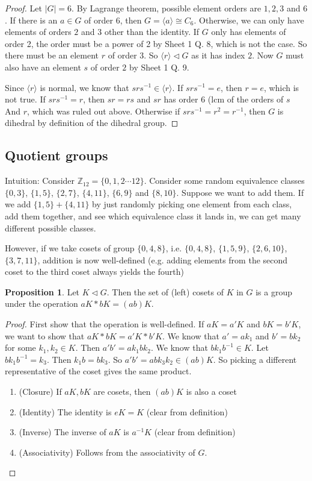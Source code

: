 \documentclass[a4paper]{article}
\theoremstyle{definition}
\newtheorem*{prop}{Proposition}
\newcommand{\Z}{\mathbb{Z}}
\newcommand{\bra}{\langle}
\newcommand{\ket}{\rangle}
\begin{document}
\begin{proof}
  Let $|G| = 6$. By Lagrange theorem, possible element orders are $1, 2, 3$ and $6$. If there is an $a\in G$ of order $6$, then $G = \bra a\ket \cong C_6$. Otherwise, we can only have elements of orders $2$ and $3$ other than the identity. If $G$ only has elements of order 2, the order must be a power of 2 by Sheet 1 Q. 8, which is not the case. So there must be an element $r$ of order 3. So $\bra r\ket\lhd G$ as it has index $2$. Now $G$ must also have an element $s$ of order $2$ by Sheet 1 Q. 9.

Since $\bra r\ket$ is normal, we know that $srs^{-1}\in \bra r\ket$. If $srs^{-1} = e$, then $r = e$, which is not true. If $srs^{-1} = r$, then $sr = rs$ and $sr$ has order $6$ (lcm of the orders of $s$ And $r$, which was ruled out above. Otherwise if $srs^{-1} = r^2 = r^{-1}$, then $G$ is dihedral by definition of the dihedral group.
\end{proof}

\subsection{Quotient groups}
Intuition: Consider $\Z_{12} = \{0, 1, 2\cdots 12\}$. Consider some random equivalence classes $\{0, 3\}$, $\{1, 5\}$, $\{2, 7\}$, $\{4, 11\}$, $\{6, 9\}$ and $\{8, 10\}$. Suppose we want to add them. If we add $\{1, 5\} + \{4, 11\}$ by just randomly picking one element from each class, add them together, and see which equivalence class it lands in, we can get many different possible classes.

However, if we take cosets of group $\{0, 4, 8\}$, i.e. $\{0, 4, 8\}$, $\{1, 5, 9\}$, $\{2, 6, 10\}$, $\{3, 7, 11\}$, addition is now well-defined (e.g. adding elements from the second coset to the third coset always yields the fourth)

\begin{prop}
  Let $K\lhd G$. Then the set of (left) cosets of $K$ in $G$ is a group under the operation $aK*bK = (ab)K$.
\end{prop}

\begin{proof}
  First show that the operation is well-defined. If $aK = a'K$ and $bK = b'K$, we want to show that $aK*bK = a'K * b'K$. We know that $a' = ak_1$ and $b' = bk_2$ for some $k_1, k_2\in K$. Then $a'b' = ak_1bk_2$. We know that $bk_1b^{-1}\in K$. Let $bk_1b^{-1} = k_3$. Then $k_1 b = bk_3$. So $a'b' = abk_3k_2\in (ab)K$. So picking a different representative of the coset gives the same product.
  \begin{enumerate}[label=\arabic{*}.]
  \item (Closure) If $aK, bK$ are cosets, then $(ab)K$ is also a coset
  \item (Identity) The identity is $eK = K$ (clear from definition)
  \item (Inverse) The inverse of $aK$ is $a^{-1}K$ (clear from definition)
  \item (Associativity) Follows from the associativity of $G$.
  \end{enumerate}
\end{proof}
\end{document}
